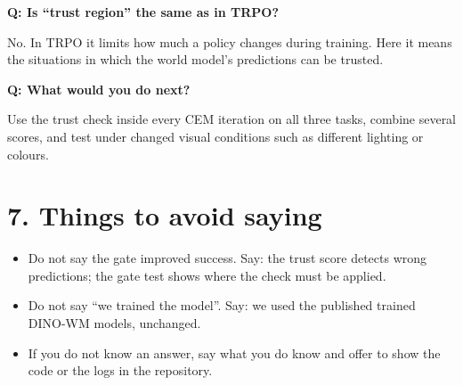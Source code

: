 \documentclass[11pt,a4paper]{article}
\newcommand{\Q}[1]{\par\medskip\noindent\textbf{\color{accent}Q: #1}\par\nopagebreak}
\newcommand{\A}{\noindent}
\begin{document}
\Q{Is ``trust region'' the same as in TRPO?}
\A No. In TRPO it limits how much a policy changes during training. Here it means the situations in which the world
model's predictions can be trusted.

\Q{What would you do next?}
\A Use the trust check inside every CEM iteration on all three tasks, combine several scores, and test under changed
visual conditions such as different lighting or colours.

\section*{7. Things to avoid saying}
\begin{itemize}
\item Do not say the gate improved success. Say: the trust score detects wrong predictions; the gate test shows where
the check must be applied.
\item Do not say ``we trained the model''. Say: we used the published trained DINO-WM models, unchanged.
\item If you do not know an answer, say what you do know and offer to show the code or the logs in the repository.
\end{itemize}
\end{document}

